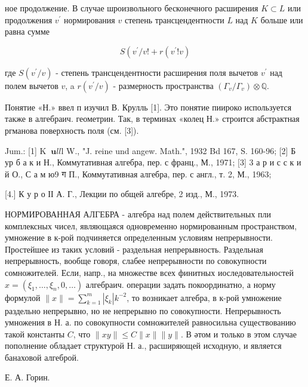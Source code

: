 \documentclass[10pt]{article}
\begin{document}
ное продолжение. В случае шроизвольного бесконечного расширения $K \subset L$ или продолжения $v^{\prime}$ нормирования $v$ степень трансцендентности $L$ над $K$ больше или равна сумме



\[

S\left(v^{\prime} / v !+r\left(v^{\prime} ! v\right)\right.

\]



где $S\left(v^{\prime} / v\right)$ - степень трансцендентности расширения поля вычетов $v^{\prime}$ над полем вычетов $v$, a $r\left(v^{\prime} / v\right)$ - размерность пространства $\left(\Gamma_{v} / \Gamma_{v}\right) \otimes \mathbb{Q}$.



Понятие «Н.» ввел п изучил В. Крулль [1]. Это понятие пиироко используется также в алгебраич. геометрин. Так, в терминах «колец Н.» строится абстрактная ргманова поверхность поля (см. [3]).



Jum.: [1] K $\mathbf{~} \mathbf{u} l l \mathrm{l}$ W., "J. reine und angew. Math.", 1932 Bd 167, S. 160-96; [2] Б ур б а к и Н., Коммутативная алгебра, пер. с франц., М., 1971; [3] 3 а р и с с к и й О., С а м ю9 ग П., Коммутативная алгебра, пер. с англ., т. 2, М., 1963;

[4.] К у р о ІІ А. Г., Лекции по общей алгебре, 2 изд., М., 1973.



НОРМИРОВАННАЯ АЛГЕБРА - алгебра над полем действительных пли комплексных чисел, являющаяся одновременно нормированным пространством, умножение в к-рой подчиняется определенным условиям непрерывности. Простейшее из таких условий - раздельная непрерывность. Раздельная непрерывность, вообще говоря, слабее непрерывности по совокупности сомножителей. Если, напр., на множестве всех финитных иоследовательностей $x=\left(\xi_{1}, \ldots, \xi_{n}, 0, \ldots\right)$ алгебраич. операции задать покоординатно, а норму формулой $\|x\|=\sum_{k=1}^{m}\left|\xi_{k}\right| k^{-2}$, то возникает алгебра, в к-рой умножение раздельно непрерывно, но не непрерывно по совокупности. Непрерывность умножения в Н. а. по совокупности сомножителей равносильна существованию такой константы $C$, что $\|x y\| \leqslant C\|x\|\|y\|$. В әтом и только в этом случае пополнение обладает структурой Н. а., расширяющей исходную, и является банаховой алгеброй.



Е. А. Горин.
\end{document}
